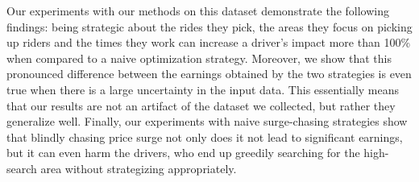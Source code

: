 Our experiments with our methods on this dataset demonstrate the following findings:
being strategic about the rides they pick, the areas they focus on picking up riders
and the times they work can increase a driver's impact more than 100\%  when compared
to a naive optimization strategy.
Moreover, we show that this pronounced difference between the earnings obtained by the 
two strategies is even true when there is a large uncertainty in the input data. This essentially means that our results are not an artifact of the dataset we collected, but rather they generalize well.
Finally, our experiments with naive surge-chasing strategies show that blindly chasing price surge not only does it not lead to significant earnings, but it can even harm the drivers, who end up greedily searching for the high-search area without strategizing appropriately.